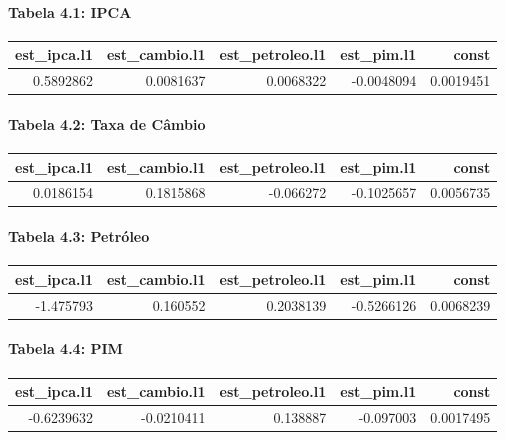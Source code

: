 \documentclass[12pt]{article}
\begin{document}
\hypertarget{tabela-4.1-ipca}{%
\paragraph{Tabela 4.1: IPCA}\label{tabela-4.1-ipca}}

\begin{longtable}[]{@{}rrrrr@{}}
\toprule
est\_ipca.l1 & est\_cambio.l1 & est\_petroleo.l1 & est\_pim.l1 &
const \\
\midrule
\endhead
0.5892862 & 0.0081637 & 0.0068322 & -0.0048094 & 0.0019451 \\
\bottomrule
\end{longtable}

\hypertarget{tabela-4.2-taxa-de-cuxe2mbio}{%
\paragraph{Tabela 4.2: Taxa de
Câmbio}\label{tabela-4.2-taxa-de-cuxe2mbio}}

\begin{longtable}[]{@{}rrrrr@{}}
\toprule
est\_ipca.l1 & est\_cambio.l1 & est\_petroleo.l1 & est\_pim.l1 &
const \\
\midrule
\endhead
0.0186154 & 0.1815868 & -0.066272 & -0.1025657 & 0.0056735 \\
\bottomrule
\end{longtable}

\hypertarget{tabela-4.3-petruxf3leo}{%
\paragraph{Tabela 4.3: Petróleo}\label{tabela-4.3-petruxf3leo}}

\begin{longtable}[]{@{}rrrrr@{}}
\toprule
est\_ipca.l1 & est\_cambio.l1 & est\_petroleo.l1 & est\_pim.l1 &
const \\
\midrule
\endhead
-1.475793 & 0.160552 & 0.2038139 & -0.5266126 & 0.0068239 \\
\bottomrule
\end{longtable}

\hypertarget{tabela-4.4-pim}{%
\paragraph{Tabela 4.4: PIM}\label{tabela-4.4-pim}}

\begin{longtable}[]{@{}rrrrr@{}}
\toprule
est\_ipca.l1 & est\_cambio.l1 & est\_petroleo.l1 & est\_pim.l1 &
const \\
\midrule
\endhead
-0.6239632 & -0.0210411 & 0.138887 & -0.097003 & 0.0017495 \\
\bottomrule
\end{longtable}
\end{document}

